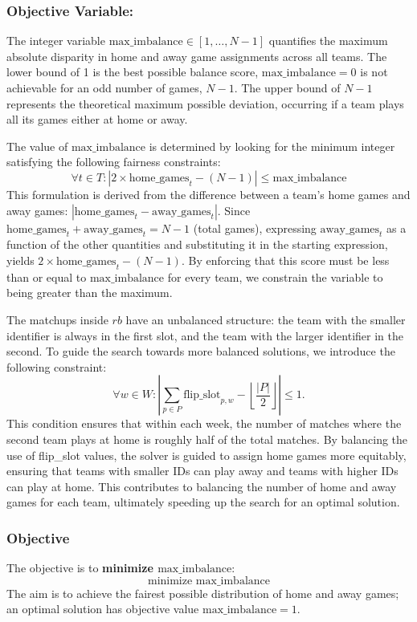 \subsubsection{Objective Variable: }\label{objective}
The integer variable $\text{max\_imbalance} \in [1, \dots, N-1]$ quantifies the maximum absolute disparity in home and away game assignments across all teams. The lower bound of 1 is the best possible balance score, $\text{max\_imbalance}=0$ is not achievable for an odd number of games, $N-1$. The upper bound of $N-1$ represents the theoretical maximum possible deviation, occurring if a team plays all its games either at home or away.

The value of $\text{max\_imbalance}$ is determined by looking for the minimum integer satisfying the following fairness constraints:
\[ \forall t \in T : \left| 2 \times \text{home\_games}_{t} - (N-1) \right| \leq \text{max\_imbalance} \]
This formulation is derived from the difference between a team's home games and away games: $|\text{home\_games}_t - \text{away\_games}_t|$. Since \\ $\text{home\_games}_{t} + \text{away\_games}_{t} = N-1$ (total games), expressing $\text{away\_games}_t$ as a function of the other quantities and substituting it in the starting expression, yields $2 \times \text{home\_games}_{t} - (N-1)$. By enforcing that this score must be less than or equal to $\text{max\_imbalance}$ for every team, we constrain the variable to being greater than the maximum.

The matchups inside $rb$ have an unbalanced structure: the team with the smaller identifier is always in the first slot, and the team with the larger identifier in the second. To guide the search towards more balanced solutions, we introduce the following constraint:
\[
\forall w \in W : \left| \sum_{p \in P} \text{flip\_slot}_{p, w} - \left\lfloor \frac{|P|}{2} \right\rfloor \right| \leq 1.
\]
This condition ensures that within each week, the number of matches where the second team plays at home is roughly half of the total matches. By balancing the use of flip\_slot values, the solver is guided to assign home games more equitably, ensuring that teams with smaller IDs can play away and teams with higher IDs can play at home. This contributes to balancing the number of home and away games for each team, ultimately speeding up the search for an optimal solution.

\subsubsection{Objective}
The objective is to \textbf{minimize $\text{max\_imbalance}$}:
\[ \text{minimize } \text{max\_imbalance} \]
The aim is to achieve the fairest possible distribution of home and away games; an optimal solution has objective value $\text{max\_imbalance}=1$.

